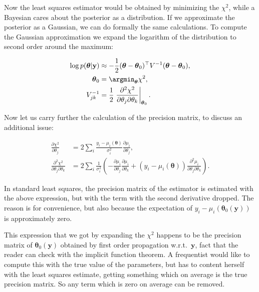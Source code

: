 Now the least squares estimator would be obtained by minimizing the $\chi^2$,
while a Bayesian cares about the posterior as a distribution. If we approximate
the posterior as a Gaussian, we can do formally the same calculations. To
compute the Gaussian approximation we expand the logarithm of the distribution
to second order around the maximum:

\begin{align}
    \log p(\boldsymbol\theta|\mathbf y) &\approx
    -\frac 12 (\boldsymbol\theta-\boldsymbol\theta_0)^\top
    V^{-1} (\boldsymbol\theta-\boldsymbol\theta_0), \\
    \boldsymbol\theta_0 &= \argmin_{\boldsymbol\theta} \chi^2, \\
    V^{-1}_{jk} &= \frac12 \left.
    \frac {\partial^2 \chi^2} {\partial\theta_j \partial\theta_k}
    \right|_{\boldsymbol\theta_0}.
\end{align}

Now let us carry further the calculation of the precision matrix, to discuss
an additional issue:

\begin{align}
    \frac{\partial\chi^2}{\partial\theta_j} &=
    2 \sum_i \frac {y_i - \mu_i(\boldsymbol\theta)} {\sigma_i^2}
    \frac {\partial\mu_i} {\partial\theta_j}, \\
    \frac {\partial^2 \chi^2} {\partial\theta_j \partial\theta_k} &=
    2 \sum_i \frac1{\sigma_i^2} \left(
    -\frac {\partial\mu_i} {\partial\theta_j}
    \frac {\partial\mu_i} {\partial\theta_k}
    + (y_i - \mu_i(\boldsymbol\theta))
    \frac {\partial^2 \mu_i} {\partial\theta_j \partial\theta_k}
    \right).
\end{align}

In standard least squares, the precision matrix of the estimator is estimated
with the above expression, but with the term with the second derivative
dropped. The reason is for convenience, but also because the expectation of
$y_i - \mu_i(\boldsymbol\theta_0(\mathbf y))$ is approximately zero.

This expression that we got by expanding the $\chi^2$ happens to be the
precision matrix of $\boldsymbol\theta_0(\mathbf y)$ obtained by first order
propagation w.r.t.~$\mathbf y$, fact that the reader can check with the
implicit function theorem. A frequentist would like to compute this with the
true value of the parameters, but has to content herself with the least squares
estimate, getting something which on average is the true precision matrix. So
any term which is zero on average can be removed.


